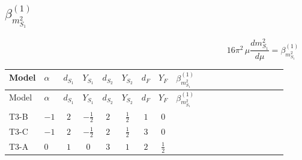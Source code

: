 \documentclass{article}
\begin{document}
\begin{landscape}
\section*{$\beta_{m_{S_1}^2}^{(1)}$}
\[16\pi^2\,\mu\frac{d m_{S_1}^2}{d\mu}=\beta_{m_{S_1}^2}^{(1)}\]
\tiny
\begin{longtable}{@{}llcccccc >{\raggedright\arraybackslash}p{0.54\linewidth}@{}}
\toprule
Model & $\alpha$ & $d_{S_1}$ & $Y_{S_1}$ & $d_{S_2}$ & $Y_{S_2}$ & $d_F$ & $Y_F$ & $\beta_{m_{S_1}^2}^{(1)}$ \\
\midrule
\endfirsthead
\toprule
Model & $\alpha$ & $d_{S_1}$ & $Y_{S_1}$ & $d_{S_2}$ & $Y_{S_2}$ & $d_F$ & $Y_F$ & $\beta_{m_{S_1}^2}^{(1)}$ \\
\midrule
\endhead
T3-B & $-1$ & $2$ & $-\frac{1}{2}$ & $2$ & $\frac{1}{2}$ & $1$ & $0$ & \scriptsize\adjustbox{max width=\linewidth}{$\begin{gathered} {m_{S_1}^2} (2 \operatorname{Tr}\!\left({y_1}\,\left({y_1}\right)^{\dagger}\right)+6 {\lambda_{S_1}}) \\ -8 \operatorname{Tr}\!\left({M_F}\,\left({M_F}\right)^{*}\,\left({y_1}\right)^{T}\,\left({y_1}\right)^{*}\right) \\ -8 \operatorname{Tr}\!\left({M_F}\,\left({y_1}\right)^{\dagger}\,{y_1}\,\left({M_F}\right)^{*}\right) \\ -\frac{9 {g_2}^2 {m_{S_1}^2}}{2} \\ -\frac{3 {g_Y}^2 {m_{S_1}^2}}{2} \\ +4 {\lambda_{12}} {m_{S_2}^2}\end{gathered}$} \\
\midrule
T3-C & $-1$ & $2$ & $-\frac{1}{2}$ & $2$ & $\frac{1}{2}$ & $3$ & $0$ & \scriptsize\adjustbox{max width=\linewidth}{$\begin{gathered} {m_{S_1}^2} (3 \operatorname{Tr}\!\left({y_1}\,\left({y_1}\right)^{\dagger}\right)+6 {\lambda_{S_1}}) \\ -12 \operatorname{Tr}\!\left({M_F}\,\left({M_F}\right)^{*}\,\left({y_1}\right)^{T}\,\left({y_1}\right)^{*}\right) \\ -12 \operatorname{Tr}\!\left({M_F}\,\left({y_1}\right)^{\dagger}\,{y_1}\,\left({M_F}\right)^{*}\right) \\ -\frac{9 {g_2}^2 {m_{S_1}^2}}{2} \\ -\frac{3 {g_Y}^2 {m_{S_1}^2}}{2} \\ +4 {\lambda_{12}} {m_{S_2}^2}\end{gathered}$} \\
\midrule
T3-A & $0$ & $1$ & $0$ & $3$ & $1$ & $2$ & $\frac{1}{2}$ & \scriptsize\adjustbox{max width=\linewidth}{$\begin{gathered} {m_{S_1}^2} (4 \operatorname{Tr}\!\left({y_1}\,\left({y_1}\right)^{\dagger}\right)+4 {\lambda_{S_1}}) \\ -8 \operatorname{Tr}\!\left({M_F}\,\left({M_F}\right)^{\dagger}\,\left({y_1}\right)^{T}\,\left({y_1}\right)^{*}\right) \\ +6 {\lambda_{12}} {m_{S_2}^2}\end{gathered}$} \\

\end{longtable}
\end{landscape}
\end{document}
